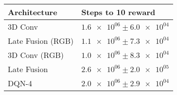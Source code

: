 \begin{tabular}{ll}
\hline
 Architecture      & Steps to 10 reward                \\
\hline
 3D Conv           & $\num{1.6e+06} \pm \num{6.0e+04}$ \\
 Late Fusion (RGB) & $\num{1.1e+06} \pm \num{7.3e+04}$ \\
 3D Conv (RGB)     & $\num{1.0e+06} \pm \num{8.3e+04}$ \\
 Late Fusion       & $\num{2.6e+06} \pm \num{2.0e+05}$ \\
 DQN-4             & $\num{2.0e+06} \pm \num{2.9e+04}$ \\
\hline
\end{tabular}